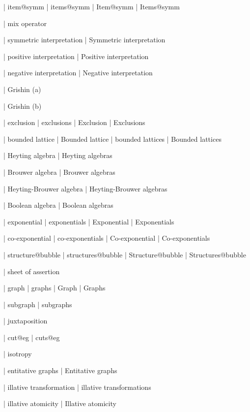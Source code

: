 | item@symm
 | items@symm
 | Item@symm
 | Items@symm

 | mix operator
 
 | symmetric interpretation
 | Symmetric interpretation

 | positive interpretation
 | Positive interpretation

 | negative interpretation
 | Negative interpretation

 | Grishin (a)

 | Grishin (b)

 | exclusion
 | exclusions
 | Exclusion
 | Exclusions
 
 | bounded lattice
 | Bounded lattice
 | bounded lattices
 | Bounded lattices

 | Heyting algebra
 | Heyting algebras

 | Brouwer algebra
 | Brouwer algebras

 | Heyting-Brouwer algebra
 | Heyting-Brouwer algebras

 | Boolean algebra
 | Boolean algebras

 | exponential
 | exponentials
 | Exponential
 | Exponentials

 | co-exponential
 | co-exponentials
 | Co-exponential
 | Co-exponentials

 | structure@bubble
 | structures@bubble
 | Structure@bubble
 | Structures@bubble


 | sheet of assertion
 
 | graph
 | graphs
 | Graph
 | Graphs

 | subgraph
 | subgraphs

 | juxtaposition

 | cut@eg
 | cuts@eg

 | isotropy

 | entitative graphs
 | Entitative graphs

 | illative transformation
 | illative transformations

 | illative atomicity
 | Illative atomicity
 
